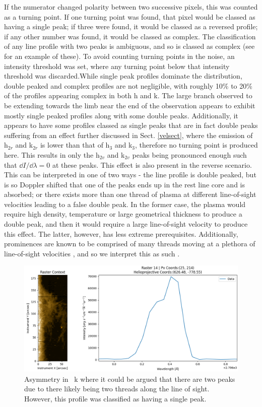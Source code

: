 If the numerator changed polarity between two successive pixels, this was counted as a turning point. If one turning point was found, that pixel would be classed as having a single peak; if three were found, it would be classed as a reversed profile; if any other number was found, it would be classed as complex. The classification of any line profile with two peaks is ambiguous, and so is classed as complex (see  for an example of these). To avoid counting turning points in the noise, an intensity threshold was set, where any turning point below that intensity threshold was discarded.While single peak profiles dominate the distribution, double peaked and complex profiles are not negligible, with roughly 10\% to 20\% of the profiles appearing complex in both h and k. The large branch observed to be extending towards the limb near the end of the observation appears to exhibit mostly single peaked profiles along with some double peaks. Additionally, it appears to have some profiles classed as single peaks that are in fact double peaks suffering from an effect further discussed in Sect. \ref{velsect}, where the emission of h$_{2r}$ and k$_{2r}$ is lower than that of h$_{3}$ and k$_{3}$, therefore no turning point is produced here. This results in only the h$_{2v}$ and k$_{2v}$ peaks being pronounced enough such that $\dd I/\dd \lambda=0$ at these peaks. This effect is also present in the reverse scenario. This can be interpreted in one of two ways - the line profile is double peaked, but is so Doppler shifted that one of the peaks ends up in the rest line core and is absorbed; or there exists more than one thread of plasma at different line-of-sight velocities leading to a false double peak. In the former case, the plasma would require high density, temperature or large geometrical thickness to produce a double peak, and then it would require a large line-of-sight velocity to produce this effect. The latter, however, has less extreme prerequisites. Additionally, prominences are known to be comprised of many threads moving at a plethora of line-of-sight velocities \citep{engvold_fine_1978}, and so we interpret this as such .

\begin{figure} 
    \centering
    \includegraphics[width=0.7\linewidth]{./01Observations/figs/asym.png}
    \caption{Asymmetry in \mgii~k where it could be argued that there are two peaks due to there likely being two threads along the line of sight. However, this profile was classified as having a single peak.}
    \label{k2vgtk2r}
\end{figure}






